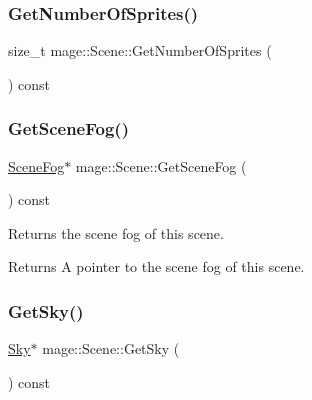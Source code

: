 \hypertarget{classmage_1_1_scene_a124042421abfee563342e50032d4051f}{}\label{classmage_1_1_scene_a124042421abfee563342e50032d4051f} 
\subsubsection{\texorpdfstring{Get\+Number\+Of\+Sprites()}{GetNumberOfSprites()}}
{\footnotesize\ttfamily size\+\_\+t mage\+::\+Scene\+::\+Get\+Number\+Of\+Sprites (\begin{DoxyParamCaption}{ }\end{DoxyParamCaption}) const\hspace{0.3cm}{\ttfamily [noexcept]}}

\hypertarget{classmage_1_1_scene_a1f21d92feb659477ceb4642322fa2f0c}{}\label{classmage_1_1_scene_a1f21d92feb659477ceb4642322fa2f0c} 
\subsubsection{\texorpdfstring{Get\+Scene\+Fog()}{GetSceneFog()}}
{\footnotesize\ttfamily \hyperlink{structmage_1_1_scene_fog}{Scene\+Fog}$\ast$ mage\+::\+Scene\+::\+Get\+Scene\+Fog (\begin{DoxyParamCaption}{ }\end{DoxyParamCaption}) const\hspace{0.3cm}{\ttfamily [noexcept]}}

Returns the scene fog of this scene.

\begin{DoxyReturn}{Returns}
A pointer to the scene fog of this scene. 
\end{DoxyReturn}
\hypertarget{classmage_1_1_scene_afecf68ec8c48d4c28082f99d8042e700}{}\label{classmage_1_1_scene_afecf68ec8c48d4c28082f99d8042e700} 
\subsubsection{\texorpdfstring{Get\+Sky()}{GetSky()}}
{\footnotesize\ttfamily \hyperlink{structmage_1_1_sky}{Sky}$\ast$ mage\+::\+Scene\+::\+Get\+Sky (\begin{DoxyParamCaption}{ }\end{DoxyParamCaption}) const\hspace{0.3cm}{\ttfamily [noexcept]}}

